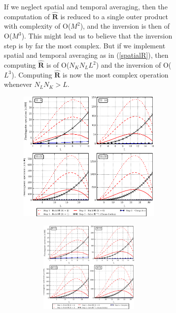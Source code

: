\documentclass[12pt,journal,draftclsnofoot,onecolumn]{IEEEtran}
\newcommand\mat[1]{\boldsymbol{#1}}
\newcommand\1{\vec 1}
\newcommand*\eR{\mat{\hat R}}
\begin{document}
\begin{figure}[H]
\begin{figure}[!t]
If we neglect spatial and temporal averaging, then the computation of $\eR$ is reduced to a single outer product with complexity of O($M^2$), and the inversion is then of O($M^3$). This might lead us to believe that the inversion step is by far the most complex. But if we implement spatial and temporal averaging as in (\ref{spatialR}), then computing $\eR$ is of O($N_K N_L L^2$) and the inversion of O($L^3$). Computing $\eR$ is now the most complex operation whenever $N_LN_K>L$.
\ifPeerReview
\begin{figure}[!t]\centering
\includegraphics[width=.8\linewidth]{gfx/buske3.eps}
\else
\begin{figure}[!t]\centering
\includegraphics[width=\linewidth]{gfx/mvdr_complexity.eps}

\end{figure}
\end{figure}
\end{figure}
\end{figure}
\end{document}
